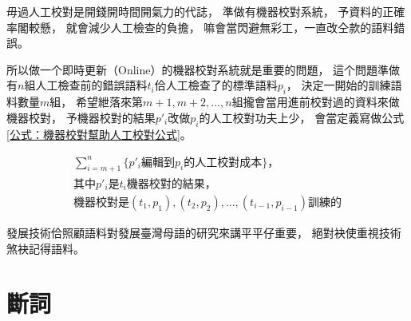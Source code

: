 

毋過人工校對是開錢開時間開氣力的代誌，
準做有機器校對系統，
予資料的正確率閣較懸，
就會減少人工檢查的負擔，
嘛會當閃避無彩工，一直改仝款的語料錯誤。

所以做一个即時更新（Online）的機器校對系統就是重要的問題，
這个問題準做有$n$組人工檢查前的錯誤語料$t_{i}$佮人工檢查了的標準語料$p_{i}$，
決定一開始的訓練語料數量$m$組，
希望紲落來第$m+1,m+2,...,n$組攏會當用進前校對過的資料來做機器校對，
予機器校對的結果$p'_{i}$改做$p_{i}$的人工校對功夫上少，
會當定義寫做公式\ref{公式：機器校對幫助人工校對公式}。

\begin{equation}
\label{公式：機器校對幫助人工校對公式}
\begin{split}
\sum\limits_{i=m+1}^n \{ p'_{i}編輯到p_{i}的人工校對成本\}，\\
其中p'_{i}是t_{i}機器校對的結果，\\
機器校對是(t_{1},p_{1}),(t_{2},p_{2}),...,(t_{i-1},p_{i-1})訓練的
\end{split}
\end{equation}


發展技術佮照顧語料對發展臺灣母語的研究來講平平仔重要，
絕對袂使重視技術煞袂記得語料。


\section{斷詞}
\label{節：未來斷詞}

